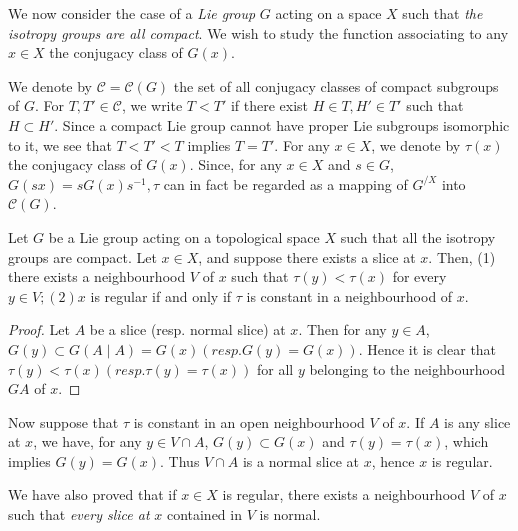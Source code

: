 We now  consider the case of a \textit{Lie group} $ G $ acting  on a
space $X$ such that  \textit{the isotropy groups are all compact}. We
wish to study the function  associating to any $ x \in X $  the
conjugacy class of  $G (x)$. 
  
  We denote  by $ \mathscr{C} = \mathscr{C} ( G ) $  the set of all
  conjugacy classes of compact subgroups of  $G$. For  $ T, T' \in
  \mathscr{C} $, we write  $ T < T' $ if  there exist  $ H \in T, H'
  \in T' $ such that  $ H \subset H' $. Since a compact Lie group
  cannot have proper Lie subgroups  isomorphic to it, we  see that  $
  T < T' < T $ implies $ T = T' $. For any $ x \in X $, we denote  by
  $ \tau (x) $ the  conjugacy class of  $ G ( x)$. Since, for  any $ x
  \in X $ and  $ s \in G $, $ G ( sx )  = sG ( x )s^{-1}, \tau $  can
  in fact be regarded  as a mapping of  $ G^{/X} $ into  $ \mathscr{C}
  (G) $. 

\begin{lem}\label{chap2:lem3}%
  Let  $G$ be a Lie  group acting  on a topological  space  $X$ such
  that all the isotropy groups are  compact. Let  $x \in X $, and
  suppose there exists  a slice at  $x$. Then, (1)  there exists a
  neighbourhood  $V$ of  $x$  such that  $ \tau (y) < \tau ( x ) $ for
  every $ y \in V; ( 2 ) x $ is  regular if and  only if  $ \tau $ is
  constant in a neighbourhood of  $x$. 
\end{lem} 
 
\begin{proof}
  Let  $A$ be a slice (resp. normal slice)  at $x$. Then for any $ y
  \in A $, $ G (y) \subset G ( A \mid A ) = G( x ) ( resp. G (y) = G
  (x)) $. Hence it is clear that  $\tau (y) < \tau (x) ( resp. \tau
  (y) = \tau (x))$ for  all $ y$  belonging to   the
  neighbourhood\pageoriginale  $GA$ of  $x$.  
\end{proof}  
  
Now  suppose  that  $ \tau $  is constant in an open neighbourhood
$ V $ of  $x$. If $A$ is any slice at  $x$, we have, for  any $ y
\in  V \cap A$,  $G(y) \subset G(x)$ and  $ \tau (y) = \tau (x) $, which
implies  $ G (y) = G (x) $. Thus  $ V \cap A $ is a normal slice at
$x$, hence $x$ is regular. 

\begin{remark*}
  We have also  proved  that  if  $x \in  X$ is  regular, there exists a
  neighbourhood  $V$  of $x$  such that  \textit{every slice at}  $x$
  contained in  $V$ is normal. 
\end{remark*}  

